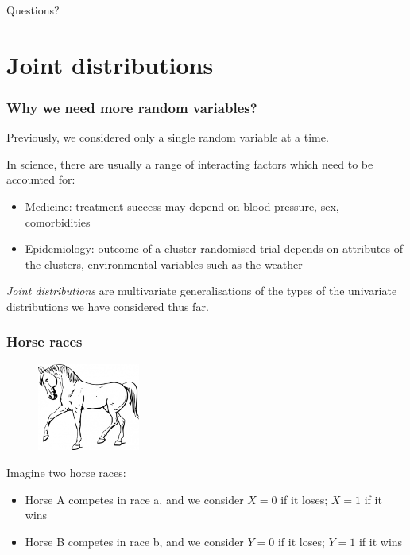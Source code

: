 \documentclass{beamer}
\begin{document}
	\begin{frame}
		\Large Questions?
	\end{frame}

	\section{Joint distributions}
	\frame{\tableofcontents[currentsection]}
	
	\begin{frame}
		\frametitle{Why we need more random variables?}
		
		Previously, we considered only a single random variable at a time.
		
		\vspace{0.5cm}
		
		In science, there are usually a range of interacting factors which need to be accounted for:
		
		\begin{itemize}
			\item Medicine: treatment success may depend on blood pressure, sex, comorbidities
			\item Epidemiology: outcome of a cluster randomised trial depends on attributes of the clusters, environmental variables such as the weather
		\end{itemize}
		
		\textit{Joint distributions} are multivariate generalisations of the types of the univariate distributions we have considered thus far.
		
	\end{frame}
	
	\begin{frame}
		\frametitle{Horse races}
		
		\begin{figure}[ht]
			\centerline{\includegraphics[width=0.3\textwidth]{./figures/horse.jpeg}}
		\end{figure}
		
		Imagine two horse races:
		
		\begin{itemize}
			\item Horse A competes in race a, and we consider $X=0$ if it loses; $X=1$ if it wins
			\item Horse B competes in race b, and we consider $Y=0$ if it loses; $Y=1$ if it wins
		\end{itemize}
		
	\end{frame}
	
\end{document}
